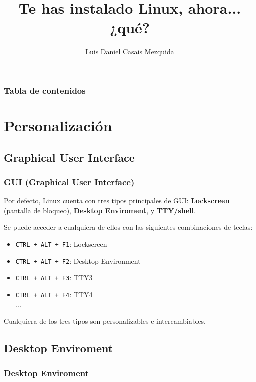 \documentclass[aspectratio=43]{beamer}
\title{Te has instalado Linux, ahora... ¿qué?} %
\author{Luis Daniel Casais Mezquida} %
\institute{\edicion \ Jornadas Técnicas del GUL}
\date{\fecha}
\begin{document}
{
    \begin{frame}
        \titlepage
    \end{frame}
}
\addtocounter{framenumber}{-1}


\begin{frame}
    \frametitle{Tabla de contenidos}
    \tableofcontents
\end{frame}


\section{Personalización}

\subsection{Graphical User Interface}

\begin{frame}
    \frametitle{GUI (Graphical User Interface)}
    Por defecto, Linux cuenta con tres tipos principales de GUI: \textbf{Lockscreen} (pantalla de bloqueo), \textbf{Desktop Enviroment}, y \textbf{TTY/shell}.\newline

    Se puede acceder a cualquiera de ellos con las siguientes combinaciones de teclas:
    \begin{itemize}
        \item \texttt{CTRL + ALT + F1}: Lockscreen
        \item \texttt{CTRL + ALT + F2}: Desktop Environment
        \item \texttt{CTRL + ALT + F3}: TTY3
        \item \texttt{CTRL + ALT + F4}: TTY4\\
        ...\newline
    \end{itemize}
    
    Cualquiera de los tres tipos son personalizables e intercambiables.
\end{frame}

\subsection{Desktop Enviroment}
\begin{frame}
    \frametitle{Desktop Enviroment}

\end{frame}
\end{document}
